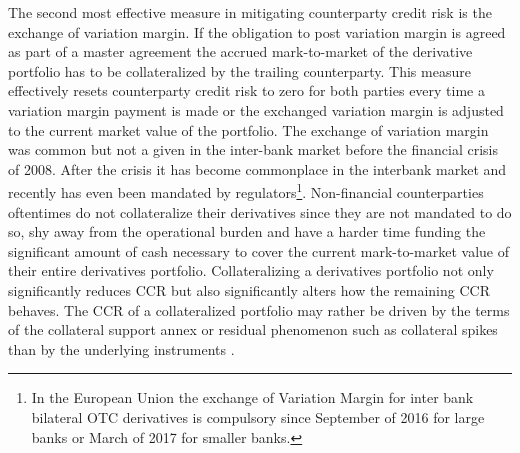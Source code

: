 \documentclass[../Thesis_AHoecherl.tex]{subfiles}
\begin{document}
The second most effective measure in mitigating counterparty credit risk is the exchange of variation margin. If the obligation to post variation margin is agreed as part of a master agreement the accrued mark-to-market of the derivative portfolio has to be collateralized by the trailing counterparty. This measure effectively resets counterparty credit risk to zero for both parties every time a variation margin payment is made or the exchanged variation margin is adjusted to the current market value of the portfolio. The exchange of variation margin was common but not a given in the inter-bank market before the financial crisis of 2008. After the crisis it has become commonplace in the interbank market and recently has even been mandated by regulators\footnote{In the European Union the exchange of Variation Margin for inter bank bilateral OTC derivatives is compulsory since September of 2016 for large banks or March of 2017 for smaller banks.}. Non-financial counterparties oftentimes do not collateralize their derivatives since they are not mandated to do so, shy away from the operational burden and have a harder time funding the significant amount of cash necessary to cover the current mark-to-market value of their entire derivatives portfolio. Collateralizing a derivatives portfolio not only significantly reduces \gls{CCR} but also significantly alters how the remaining \gls{CCR} behaves. The \gls{CCR} of a collateralized portfolio may rather be driven by the terms of the collateral support annex or residual phenomenon such as collateral spikes than by the underlying instruments \cite{andersen2017does}. 
\end{document}
